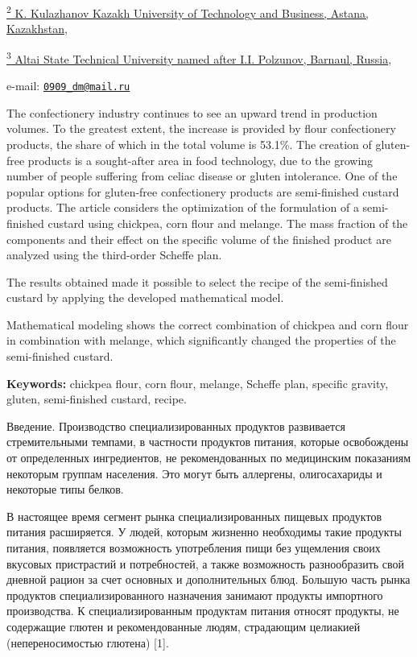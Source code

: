 \href{https://bankchart.kz/spravochniki/pochtovyye_indeksy/id/116470}{\textsuperscript{2}
K. Kulazhanov Kazakh University of Technology and Business, Astana,
Kazakhstan,}

\href{https://bankchart.kz/spravochniki/pochtovyye_indeksy/id/116470}{\textsuperscript{3}
Altai State Technical University named after I.I. Polzunov, Barnaul,
Russia},

e-mail: \href{mailto:0909_dm@mail.ru}{\nolinkurl{0909\_dm@mail.ru}}

The confectionery industry continues to see an upward trend in
production volumes. To the greatest extent, the increase is provided by
flour confectionery products, the share of which in the total volume is
53.1\%. The creation of gluten-free products is a sought-after area in
food technology, due to the growing number of people suffering from
celiac disease or gluten intolerance. One of the popular options for
gluten-free confectionery products are semi-finished custard products.
The article considers the optimization of the formulation of a
semi-finished custard using chickpea, corn flour and melange. The mass
fraction of the components and their effect on the specific volume of
the finished product are analyzed using the third-order Scheffe plan.

The results obtained made it possible to select the recipe of the
semi-finished custard by applying the developed mathematical model.

Mathematical modeling shows the correct combination of chickpea and corn
flour in combination with melange, which significantly changed the
properties of the semi-finished custard.

{\bfseries Keywords:} chickpea flour, corn flour, melange, Scheffe plan,
specific gravity, gluten, semi-finished custard, recipe.

Введение. Производство специализированных продуктов развивается
стремительными темпами, в частности продуктов питания, которые
освобождены от определенных ингредиентов, не рекомендованных по
медицинским показаниям некоторым группам населения. Это могут быть
аллергены, олигосахариды и некоторые типы белков.

В настоящее время сегмент рынка специализированных пищевых продуктов
питания расширяется. У людей, которым жизненно необходимы такие продукты
питания, появляется возможность употребления пищи без ущемления своих
вкусовых пристрастий и потребностей, а также возможность разнообразить
свой дневной рацион за счет основных и дополнительных блюд. Большую
часть рынка продуктов специализированного назначения занимают продукты
импортного производства. К специализированным продуктам питания относят
продукты, не содержащие глютен и рекомендованные людям, страдающим
целиакией (непереносимостью глютена) {[}1{]}.

